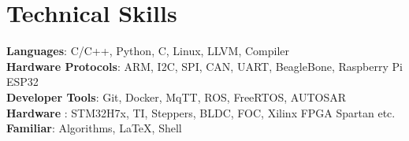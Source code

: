 \documentclass[letterpaper,11pt]{article}
\begin{document}
\section{Technical Skills}
 \begin{itemize}[leftmargin=0.15in, label={}]
    \small{\item{
     \textbf{Languages}{: C/C++, Python, C, Linux, LLVM, Compiler} \\
     \textbf{Hardware Protocols}{: ARM, I2C, SPI, CAN, UART, BeagleBone, Raspberry Pi  ESP32} \\
     \textbf{Developer Tools}{: Git, Docker, MqTT, ROS, FreeRTOS, AUTOSAR} \\
     \textbf{Hardware }{: STM32H7x, TI, Steppers, BLDC, FOC, Xilinx FPGA Spartan etc.} \\
     \textbf{Familiar}{: Algorithms, \LaTeX, Shell}
    }}
\end{itemize}\vspace{-20pt}



\end{document}
